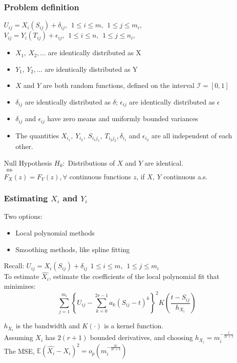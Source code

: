 \documentclass[10pt,dvipsnames,table]{beamer}
\newcommand{\Exp}{\mathds{E}}
\newcommand{\I}{\mathcal{I}}
\begin{document}
\begin{frame}
\frametitle{Problem definition}
$U_{ij} = X_i(S_{ij}) + \delta_{ij},\ \ 1 \leq i \leq m,\ \ 1 \leq j \leq m_i,$ \\
$V_{ij} = Y_i(T_{ij}) + \epsilon_{ij},\ \ 1 \leq i \leq n,\ \ 1 \leq j \leq n_i,$ \\

\begin{itemize}
\item
$X_1,\ X_2,\dots$ are identically distributed as X
\item
$Y_1,\ Y_2,\dots$ are identically distributed as Y
\item
$X$ and $Y$ are both random functions, defined on the interval $\I = [0, 1]$
\item
$\delta_{ij}$ are identically distributed as $\delta$; $\epsilon_{ij}$ are identically distributed as $\epsilon$
\item
$\delta_{ij}$ and $\epsilon_{ij}$ have zero means and uniformly bounded variances
\item
The quantities $X_{i_1},\ Y_{i_2},\ S_{i_1j_1},\ T_{i_2j_2}, \delta_{i_1}$ and $\epsilon_{i_2}$ are all independent of each other.
\end{itemize}

\begin{block}{Null Hypothesis}
$H_0: $ Distributions of $X$ and $Y$ are identical. \\ $\Leftrightarrow$ \\ $F_X(z) = F_Y(z), \forall $ continuous functions $z$, if $X,\ Y$ continuous a.s.
\end{block}
\end{frame}

\begin{frame}
\frametitle{Estimating $X_i$ and $Y_i$}
Two options:
\begin{itemize}
\item  Local polynomial methods
\item  Smoothing methods, like spline fitting
\end{itemize}
 Recall: $U_{ij} = X_i(S_{ij}) + \delta_{ij}\ \ 1 \leq i \leq m,\ \ 1 \leq j \leq m_i$\\
 To estimate $\hat{X_i}$, estimate the coefficients of the local polynomial fit that minimizes:
\[\sum _{j=1}^{m_i}\left\{U_{ij} - \sum_{k=0}^{2r - 1} a_k(S_{ij} - t)^k\right\}^2 K\left(\frac{t - S_{ij}}{h_{X_i}} \right) \]

$h_{X_i}$ is the bandwidth and $K(\cdot)$ is a kernel function. \\

Assuming $X_i$ has $2(r + 1)$ bounded derivatives, and choosing $h_{X_i} = m_i^{-\frac{1}{2r + 1}}$ \\
The MSE, $\Exp(\hat{X_i} - X_i)^2 = o_p(m_i^{-\frac{2r}{2r+3}}) $
\end{frame}
\end{document}
